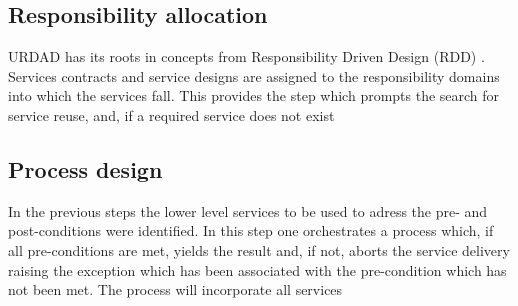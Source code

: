 \subsection{Responsibility allocation}

URDAD has its roots in concepts from Responsibility Driven Design (RDD) \cite{wirfs-brock_object-oriented_1989,wirfs-brock_object_2002}. Services contracts and service designs are assigned to the responsibility domains into which the services fall. This provides the step which prompts the search for service reuse, and, if a required service does not exist


\subsection{Process design}
In the previous steps the lower level services to be used to adress the pre- and post-conditions were identified. In this step one orchestrates a process which, if all pre-conditions are met, yields the result and, if not, aborts the service delivery raising the exception which has been associated with the pre-condition which has not been met. The process will incorporate all services








